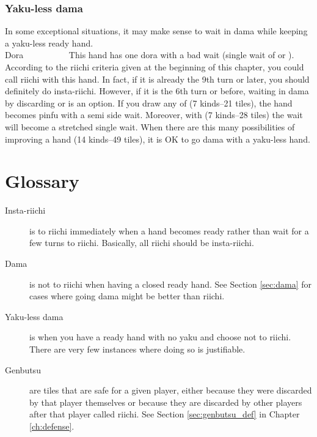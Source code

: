 \subsubsection*{{\jap Yaku}-less {\jap dama}}
In some exceptional situations, it may make sense to wait in {\jap dama} while keeping a {\jap yaku}-less ready hand.
\bp
{}~~\\
\hfill\footnotesize{{\jap Dora}~~~~~~~~~~}
\ep
This hand has one {\jap dora} with a bad wait (single wait of {\LARGE {}} or {\LARGE {}}). According to the riichi criteria given at the beginning of this chapter, you could call riichi with this hand. In fact, if it is already the 9th turn or later, you should definitely do insta-riichi. However, if it is the 6th turn or before, waiting in {\jap dama} by discarding {\LARGE {}} or {\LARGE{}} is an option.
If you draw any of {\LARGE{}} (7 kinds--21 tiles), the hand becomes {\jap pinfu} with a semi side wait. Moreover, with {\LARGE{}} (7 kinds--28 tiles) the wait will become a stretched single wait. When there are this many possibilities of improving a hand (14 kinds--49 tiles), it is OK to go {\jap dama} with a {\jap yaku}-less hand.

\bigskip
\section{Glossary}

\begin{description}
\item[Insta-riichi] is to riichi immediately when a hand becomes ready rather than wait for a few turns to riichi. Basically, all riichi should be insta-riichi.
\item[{\jap Dama}] is not to riichi when having a closed ready hand. See Section \ref{sec:dama} for cases where going {\jap dama} might be better than riichi.
\item[{\jap Yaku}-less {\jap dama}] is when you have a ready hand with no {\jap yaku} and choose not to riichi. There are very few instances where doing so is justifiable.
\item[{\jap Genbutsu}] are tiles that are safe for a given player, either because they were discarded by that player themselves or because they are discarded by other players after that player called riichi. See Section \ref{sec:genbutsu_def} in Chapter \ref{ch:defense}.
\end{description}

